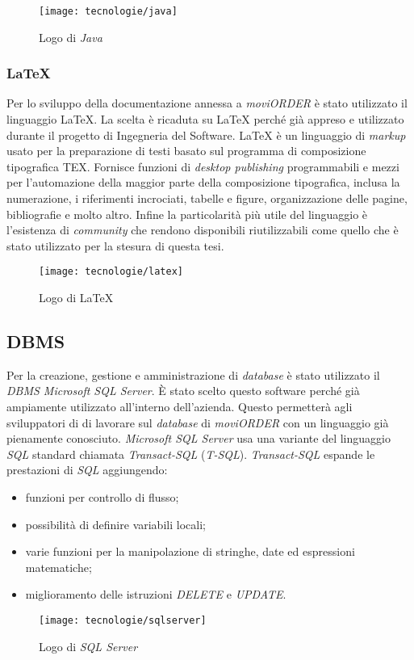 \begin{figure}[!h] 
    \centering 
    \texttt{[image: tecnologie/java]} 
    \caption{Logo di \textit{Java}}
\end{figure}

\subsubsection{\LaTeX{}}

Per lo sviluppo della documentazione annessa a \textit{moviORDER} è stato utilizzato il linguaggio \LaTeX{}. La scelta è ricaduta su \LaTeX{} perché già appreso e utilizzato durante il progetto di Ingegneria del Software. \LaTeX{} è un linguaggio di \textit{markup} usato per la preparazione di testi basato sul programma di composizione tipografica TEX. Fornisce funzioni di \textit{desktop publishing} programmabili e mezzi per l'automazione della maggior parte della composizione tipografica, inclusa la numerazione, i riferimenti incrociati, tabelle e figure, organizzazione delle pagine, bibliografie e molto altro. Infine la particolarità più utile del linguaggio è l'esistenza di \textit{community} che rendono disponibili  riutilizzabili come quello che è stato utilizzato per la stesura di questa tesi.

\begin{figure}[!h] 
    \centering 
    \texttt{[image: tecnologie/latex]} 
    \caption{Logo di \LaTeX{}}
\end{figure}

\subsection{DBMS}

Per la creazione, gestione e amministrazione di \textit{database} è stato utilizzato il \textit{DBMS Microsoft SQL Server}. È stato scelto questo software perché già ampiamente utilizzato all'interno dell'azienda. Questo permetterà agli sviluppatori di \visione{} di lavorare sul \textit{database} di \textit{moviORDER} con un linguaggio già pienamente conosciuto. \textit{Microsoft SQL Server} usa una variante del linguaggio \textit{SQL} standard chiamata \textit{Transact-SQL} (\textit{T-SQL}). \textit{Transact-SQL} espande le prestazioni di \textit{SQL} aggiungendo:
\begin{itemize}
	\item funzioni per controllo di flusso;
	\item possibilità di definire variabili locali;
	\item varie funzioni per la manipolazione di stringhe, date ed espressioni matematiche;
	\item miglioramento delle istruzioni \textit{DELETE} e \textit{UPDATE}.
\end{itemize}

\begin{figure}[!h] 
    \centering 
    \texttt{[image: tecnologie/sqlserver]} 
    \caption{Logo di \textit{SQL Server}}
\end{figure}